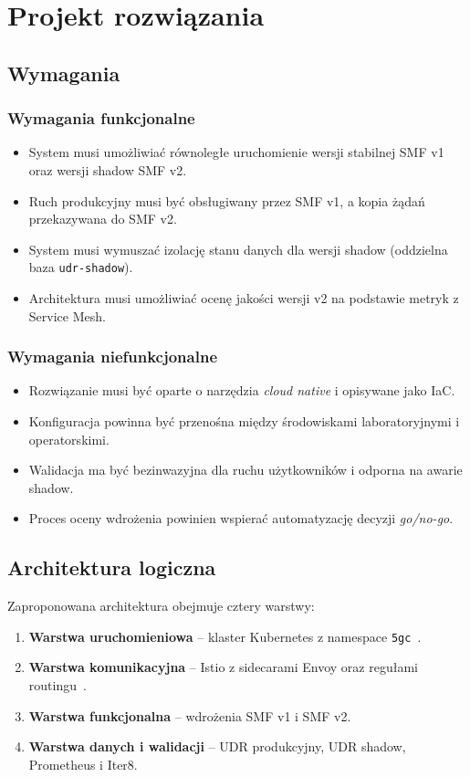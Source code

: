 \chapter{Projekt rozwiązania}

\section{Wymagania}
\subsection*{Wymagania funkcjonalne}
\begin{itemize}
    \item System musi umożliwiać równoległe uruchomienie wersji stabilnej SMF v1 oraz wersji shadow SMF v2.
    \item Ruch produkcyjny musi być obsługiwany przez SMF v1, a kopia żądań przekazywana do SMF v2.
    \item System musi wymuszać izolację stanu danych dla wersji shadow (oddzielna baza \texttt{udr-shadow}).
    \item Architektura musi umożliwiać ocenę jakości wersji v2 na podstawie metryk z Service Mesh.
\end{itemize}

\subsection*{Wymagania niefunkcjonalne}
\begin{itemize}
    \item Rozwiązanie musi być oparte o narzędzia \emph{cloud native} i opisywane jako IaC.
    \item Konfiguracja powinna być przenośna między środowiskami laboratoryjnymi i operatorskimi.
    \item Walidacja ma być bezinwazyjna dla ruchu użytkowników i odporna na awarie shadow.
    \item Proces oceny wdrożenia powinien wspierać automatyzację decyzji \emph{go/no-go}.
\end{itemize}

\section{Architektura logiczna}
Zaproponowana architektura obejmuje cztery warstwy:
\begin{enumerate}
    \item \textbf{Warstwa uruchomieniowa} -- klaster Kubernetes z namespace \texttt{5gc}~\cite{kubernetesDocs}.
    \item \textbf{Warstwa komunikacyjna} -- Istio z sidecarami Envoy oraz regułami routingu~\cite{istioDocs,envoyDocs}.
    \item \textbf{Warstwa funkcjonalna} -- wdrożenia SMF v1 i SMF v2.
    \item \textbf{Warstwa danych i walidacji} -- UDR produkcyjny, UDR shadow, Prometheus i Iter8.
\end{enumerate}

